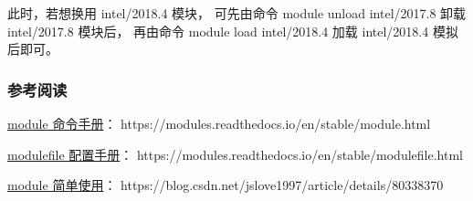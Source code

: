 \documentclass[UTF8]{ctexart}
\newcommand{\mynote}[1]{\colorbox{gray!35}{#1}}
\begin{document}
此时，若想换用 intel/2018.4 模块，
可先由命令 \mynote{module unload intel/2017.8} 卸载 intel/2017.8 模块后，
再由命令 \mynote{module load intel/2018.4} 加载 intel/2018.4 模拟后即可。

\subsubsection{参考阅读}
\href{https://modules.readthedocs.io/en/stable/module.html}{module 命令手册}：
https://modules.readthedocs.io/en/stable/module.html

\href{https://modules.readthedocs.io/en/stable/modulefile.html}{modulefile 配置手册}：
https://modules.readthedocs.io/en/stable/modulefile.html

\href{https://blog.csdn.net/jslove1997/article/details/80338370}{module 简单使用}：
https://blog.csdn.net/jslove1997/article/details/80338370
\end{document}
